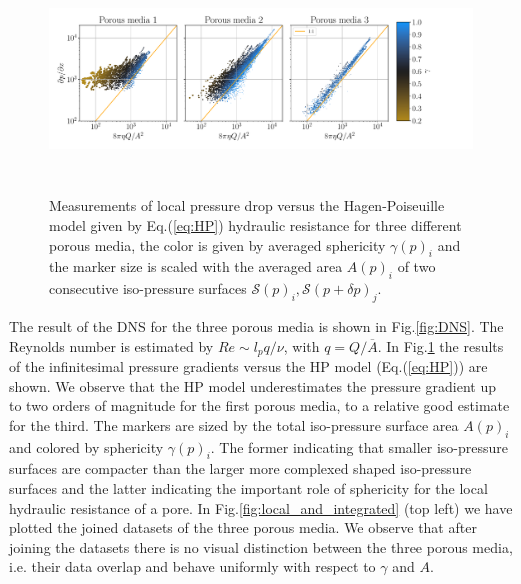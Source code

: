 \documentclass[draft]{agujournal2019}
\begin{document}
\begin{figure}
\includegraphics[height=6cm]{figures/infi_dpdx_3.pdf}
\caption{Measurements of local pressure drop versus the Hagen-Poiseuille model given by Eq.(\ref{eq:HP}) hydraulic resistance for three different porous media, the color is given by averaged sphericity $\gamma(p)_i$ and the marker size is scaled with the averaged area $A(p)_i$ of two consecutive iso-pressure surfaces $\mathcal{S}(p)_i,\mathcal{S}(p+\delta p)_j$. }
\label{fig:local_pressure_drop}
\end{figure}

The result of the DNS for the three porous media is shown in Fig.\ref{fig:DNS}. The Reynolds number is estimated by $Re \sim l_p q/\nu$, with $q = Q/\overline{A}$. In Fig.\ref{fig:local_pressure_drop} the results of the infinitesimal pressure gradients versus the HP model (Eq.(\ref{eq:HP})) are shown. We observe that the HP model underestimates the pressure gradient up to two orders of magnitude for the first porous media, to a relative good estimate for the third. The markers are sized by the total iso-pressure surface area $A(p)_i$ and colored by sphericity $\gamma(p)_i$. The former indicating that smaller iso-pressure surfaces are compacter than the larger more complexed shaped iso-pressure surfaces and the latter indicating the important role of sphericity for the local hydraulic resistance of a pore. In Fig.\ref{fig:local_and_integrated} (top left) we have plotted the joined datasets of the three porous media. We observe that after joining the datasets there is no visual distinction between the three porous media, i.e. their data overlap and behave uniformly with respect to $\gamma$ and $A$.
 
\end{document}
